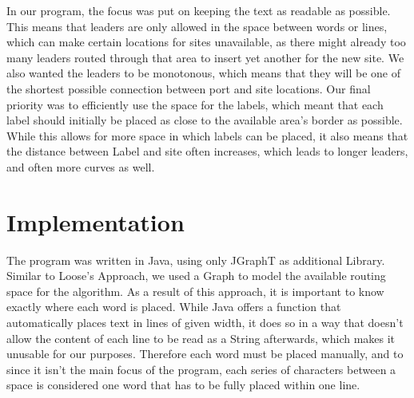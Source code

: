 \documentclass[11pt,a4paper]{article}
\begin{document}
In our program, %
the focus was put on keeping the text as readable as possible. This means that leaders are only allowed in the space between words or lines, which can make certain locations for sites unavailable, as there might already too many leaders routed through that area to insert yet another for the new site. 
We also wanted the leaders to be monotonous, which means that they will be one of the shortest possible connection between port and site locations.
Our final priority was to efficiently use the space for the labels, which meant that each label should initially be placed as close to the available area's border as possible.
While this allows for more space in which labels can be placed, it also means that the distance between Label and site often increases, which leads to longer leaders, and often more curves as well.

\section{Implementation}
The program was written in Java, using only JGraphT%
as additional Library.
Similar to Loose's Approach\cite{Loose2015}, we used a Graph to model the available routing space for the algorithm. As a result of this approach, it is important to know exactly where each word is placed. While Java offers a function that automatically places text in lines of given width, it does so in a way that doesn't allow the content of each line to be read as a String afterwards, which makes it unusable for our purposes. Therefore each word must be placed manually, and to since it isn't the main focus of the program, each series of characters between a space is considered one word that has to be fully placed within one line.











\end{document}
